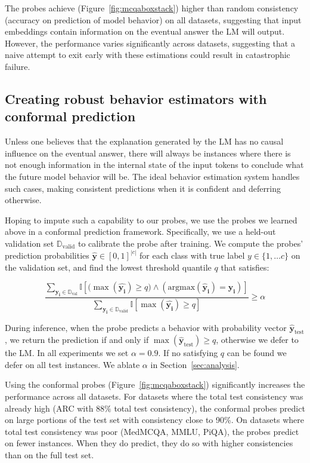 The probes achieve (Figure~\ref{fig:mcqaboxstack}) higher than random consistency (accuracy on prediction of model behavior) on all datasets, suggesting that input embeddings contain information on the eventual answer the LM will output. However, the performance varies significantly across datasets, suggesting that a naive attempt to exit early with these estimations could result in catastrophic failure.  

\subsection{Creating robust behavior estimators with conformal prediction}
Unless one believes that the explanation generated by the LM has no causal influence on the eventual answer, there will always be instances where there is not enough information in the internal state of the input tokens to conclude what the future model behavior will be. The ideal behavior estimation system handles such cases, making consistent predictions when it is confident and deferring otherwise. 

Hoping to impute such a capability to our probes, we use the probes we learned above in a conformal prediction framework. Specifically, we use a held-out validation set $\mathbb{D}_\text{valid}$ to calibrate the probe after training. We compute the probes' prediction probabilities $\mathbf{\hat{y}}\in[0, 1]^{|c|}$ for each class with true label $y\in\{1,\ldots c\}$ on the validation set, and find the lowest threshold quantile $q$ that satisfies: 

\begin{equation}
    \frac{\sum_{ \mathbf{y_i}\in \mathbb{D}_\text{val}}\mathbb{I}[(\max{(\mathbf{\hat{y_i}})\geq q) \land (\text{argmax}(\mathbf{\hat{y}_i})=\mathbf{y_i})}]}{\sum_{ \mathbf{y_i}\in\mathbb{D}_\text{valid}}\mathbb{I}[\max{(\mathbf{\hat{y_i}})\geq q}]} \geq \alpha
\end{equation}

During inference, when the probe predicts a behavior with probability vector $\mathbf{\hat{y}}_{\text{test}}$, we return the prediction if and only if $\max{(\mathbf{\hat{y}}_\text{test})} \geq q$, otherwise we defer to the LM. In all experiments we set $\alpha=0.9$. If no satisfying $q$ can be found we defer on all test instances. We ablate $\alpha$ in Section~\ref{sec:analysis}.  

Using the conformal probes (Figure~\ref{fig:mcqaboxstack}) significantly increases the performance across all datasets. For datasets where the total test consistency was already high (ARC with $88\%$ total test consistency), the conformal probes predict on large portions of the test set with consistency close to 90\%. On datasets where total test consistency was poor (MedMCQA, MMLU, PiQA), the probes predict on fewer instances. When they do predict, they do so with higher consistencies than on the full test set. 

